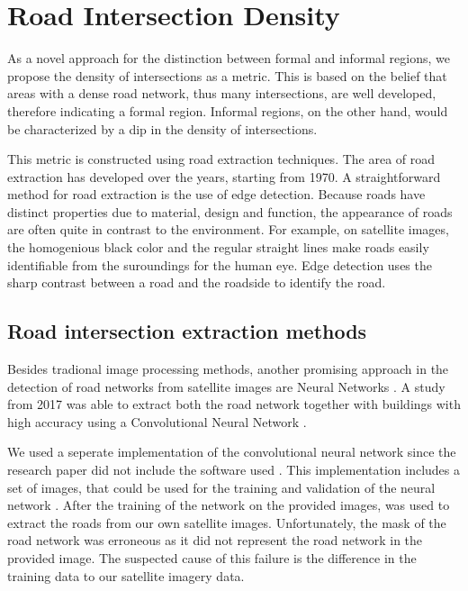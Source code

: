 \section{Road Intersection Density}

%

As a novel approach for the distinction between formal and informal regions, we
propose the density of intersections as a metric. This is based on the belief that
areas with a dense road network, thus many intersections, are well
developed, therefore indicating a formal region. Informal regions, on the other
hand, would be characterized by a dip in the density of intersections.  

This metric is constructed using road extraction techniques. The area of road
extraction has developed over the years, starting from 1970. A straightforward
method for road extraction is the use of edge detection. Because roads have
distinct properties due to material, design and function, the appearance of
roads are often quite in contrast to the environment. For example, on satellite
images, the homogenious black color and the regular straight lines make
roads easily identifiable from the suroundings for the human eye. Edge
detection uses the sharp contrast between a road and the roadside to identify
the road.


\subsection{Road intersection extraction methods}

Besides tradional image processing methods, another promising approach in the
detection of road networks from satellite images are Neural Networks
\cite{mangala2011extraction} \cite{mokhtarzade2007road}. A study from 2017 was
able to extract both the road network together with buildings with high
accuracy using a Convolutional Neural Network \cite{alshehhi2017simultaneous}.

We used a seperate implementation of the convolutional neural network since the
research paper did not include the software used \cite{airs}. This
implementation includes a set of images, that could be used for the training
and validation of the neural network \cite{MnihThesis}. After the training of
the network on the provided images, was used to extract the roads from our own
satellite images.  Unfortunately, the mask of the road network was erroneous as
it did not represent the road network in the provided image. The suspected
cause of this failure is the difference in the training data to our satellite
imagery data.

